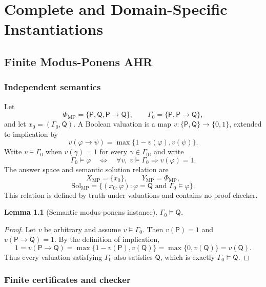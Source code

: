 \documentclass[11pt,oneside]{book}
\newtheorem{lemma}[definition]{Lemma}
\theoremstyle{remark}
\newcommand{\Sol}{\mathrm{Sol}}
\begin{document}
\part{Complete and Domain-Specific Instantiations}

\chapter{Finite Modus-Ponens AHR}

\section{Independent semantics}

Let
\[
\Phi_{\mathrm{MP}}=\{\mathsf P,\mathsf Q,\mathsf P\to\mathsf Q\},
\qquad
\Gamma_0=\{\mathsf P,\mathsf P\to\mathsf Q\},
\]
and let $x_0=(\Gamma_0,\mathsf Q)$. A Boolean valuation is a map
$v:\{\mathsf P,\mathsf Q\}\to\{0,1\}$, extended to implication by
\[
v(\varphi\to\psi)=\max\{1-v(\varphi),v(\psi)\}.
\]
Write $v\models\Gamma_0$ when $v(\gamma)=1$ for every
$\gamma\in\Gamma_0$, and write
\[
\Gamma_0\models\varphi
\quad\Longleftrightarrow\quad
\forall v,\;v\models\Gamma_0\Longrightarrow v(\varphi)=1.
\]
The answer space and semantic solution relation are
\[
X_{\mathrm{MP}}=\{x_0\},
\qquad
Y_{\mathrm{MP}}=\Phi_{\mathrm{MP}},
\]
\[
\Sol_{\mathrm{MP}}
=\{(x_0,\varphi):\varphi=\mathsf Q
\text{ and }\Gamma_0\models\varphi\}.
\]
This relation is defined by truth under valuations and contains no proof
checker.

\begin{lemma}[Semantic modus-ponens instance]
$\Gamma_0\models\mathsf Q$.
\end{lemma}

\begin{proof}
Let $v$ be arbitrary and assume $v\models\Gamma_0$. Then
$v(\mathsf P)=1$ and $v(\mathsf P\to\mathsf Q)=1$. By the definition of
implication,
\[
1=v(\mathsf P\to\mathsf Q)
=\max\{1-v(\mathsf P),v(\mathsf Q)\}
=\max\{0,v(\mathsf Q)\}
=v(\mathsf Q).
\]
Thus every valuation satisfying $\Gamma_0$ also satisfies $\mathsf Q$, which
is exactly $\Gamma_0\models\mathsf Q$.
\end{proof}

\section{Finite certificates and checker}
\end{document}
